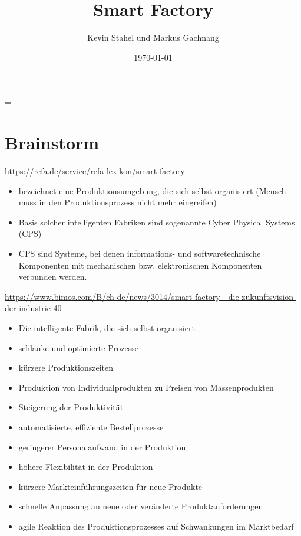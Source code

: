 \documentclass[11pt,titlepage]{article}
\title{Smart Factory}
\author{Kevin Stahel und Markus Gachnang}
\date{\today{}}
\begin{document}
\sffamily
\maketitle
\newpage
\tableofcontents{}
\setcounter{page}{1}
\newpage
\RaggedRight
\emergencystretch=\maxdimen
{}
\section{Brainstorm}
\label{sec:Brainstorm}
  \url{https://refa.de/service/refa-lexikon/smart-factory}
  \begin{itemize}
    \item bezeichnet eine Produktionsumgebung, die sich selbst organisiert (Mensch muss in den Produktionsprozess nicht mehr eingreifen)
    \item Basis solcher intelligenten Fabriken sind sogenannte Cyber Physical Systems (CPS)
    \item CPS sind Systeme, bei denen informations- und softwaretechnische Komponenten mit mechanischen bzw. elektronischen Komponenten verbunden werden. 
  \end{itemize}


  \url{https://www.bimos.com/B/ch-de/news/3014/smart-factory---die-zukunftsvision-der-industrie-40}
  \begin{itemize}
    \item Die intelligente Fabrik, die sich selbst organisiert
    \item schlanke und optimierte Prozesse
    \item kürzere Produktionszeiten
    \item Produktion von Individualprodukten zu Preisen von Massenprodukten
    \item Steigerung der Produktivität
    \item automatisierte, effiziente Bestellprozesse
    \item geringerer Personalaufwand in der Produktion
    \item höhere Flexibilität in der Produktion
    \item kürzere Markteinführungszeiten für neue Produkte
    \item schnelle Anpassung an neue oder veränderte Produktanforderungen
    \item agile Reaktion des Produktionsprozesses auf Schwankungen im Marktbedarf
  \end{itemize}
\end{document}
